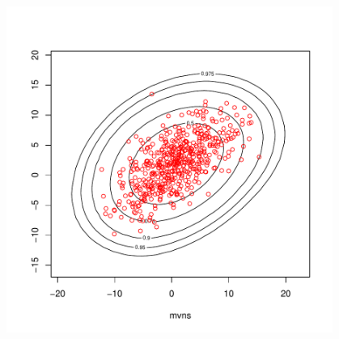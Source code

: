 \documentclass[mathserif,graphics]{beamer}
\begin{document}
{\begin{example}
\begin{minipage}{0.50\textwidth}
\end{minipage}
\hfill
\begin{minipage}{0.4\textwidth}
\includegraphics[width=0.8\textwidth]{report-plotMVNSim}
\end{minipage}
\end{example}
}
\end{document}
